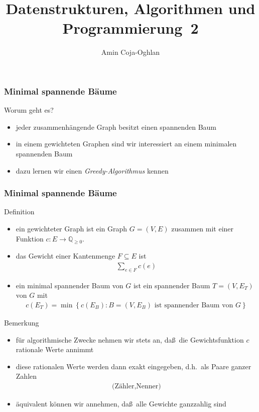 \documentclass[aspectratio=1610, 11pt]{beamer}
\title{Datenstrukturen, Algorithmen und Programmierung~2}
\author[A.~Coja-Oghlan]{Amin Coja-Oghlan}
\institute[DAP2]{Lehrstuhl Informatik 2\\Fakult\"at f\"ur Informatik}
\newcommand\QQpos{\mathbb Q_{\geq0}}
\newcommand\cbc[1]{\left\{{#1}\right\}}
\newcommand{\mytitle}{Minimal spannende B\"aume}
\begin{document}
\frame[plain]{\titlepage}

\begin{frame}\frametitle{\mytitle}
	\begin{exampleblock}{Worum geht es?}
		\begin{itemize}
			\item jeder zusammenh\"angende Graph besitzt einen spannenden Baum
			\item in einem gewichteten Graphen sind wir interessiert an einem \alert{minimalen} spannenden Baum
			\item dazu lernen wir einen \emph{Greedy-Algorithmus} kennen
		\end{itemize}
	\end{exampleblock}
\end{frame}

\begin{frame}\frametitle{\mytitle}
	\begin{overprint}
\begin{block}{Definition}
		\begin{itemize}
			\item ein \alert{gewichteter Graph} ist ein Graph $G=(V,E)$ zusammen mit einer Funktion $c:E\to \QQpos$.
			\item das \alert{Gewicht} einer Kantenmenge $F\subseteq E$ ist
				\begin{align*}
					\sum_{e\in F}c(e)
				\end{align*}
			\item ein \alert{minimal spannender Baum} von $G$ ist ein spannender Baum $T=(V,E_T)$ von $G$ mit
				\begin{align*}
					c(E_T)=\min\cbc{c(E_B):B=(V,E_B)\mbox{ ist spannender Baum von }G}
				\end{align*}
		\end{itemize}
	\end{block}
\begin{exampleblock}{Bemerkung}
		\begin{itemize}
			\item f\"ur algorithmische Zwecke nehmen wir stets an, da\ss\ die Gewichtsfunktion $c$ rationale Werte annimmt
			\item diese rationalen Werte werden dann exakt eingegeben, d.h.\ als Paare ganzer Zahlen
				\begin{align*}
					\mbox{(Z\"ahler,Nenner)}
				\end{align*}
			\item \"aquivalent k\"onnen wir annehmen, da\ss\ alle Gewichte ganzzahlig sind
		\end{itemize}
	\end{exampleblock}
	\end{overprint}
\end{frame}
\end{document}
